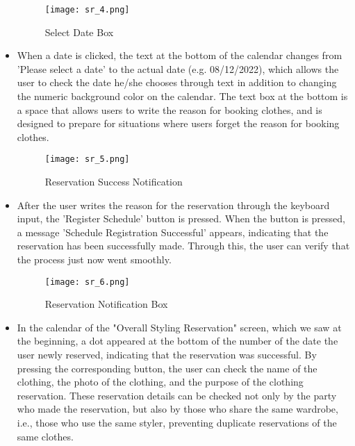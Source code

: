 \documentclass[conference]{IEEEtran}
\begin{document}
\begin{itemize}
    \begin{figure}[htbp]
    \centerline{\texttt{[image: sr\_4.png]}}
    \label{fig}
    \caption{Select Date Box}
    \end{figure}
    \item When a date is clicked, the text at the bottom of the calendar changes from 'Please select a date' to the actual date (e.g. 08/12/2022), which allows the user to check the date he/she chooses through text in addition to changing the numeric background color on the calendar.
    The text box at the bottom is a space that allows users to write the reason for booking clothes, and is designed to prepare for situations where users forget the reason for booking clothes.\\
    
    \newpage
    \begin{figure}[htbp]
    \centerline{\texttt{[image: sr\_5.png]}}
    \label{fig}
    \caption{Reservation Success Notification}
    \end{figure}
    \item After the user writes the reason for the reservation through the keyboard input, the 'Register Schedule' button is pressed. When the button is pressed, a message 'Schedule Registration Successful' appears, indicating that the reservation has been successfully made. Through this, the user can verify that the process just now went smoothly.\\
    
    \begin{figure}[htbp]
    \centerline{\texttt{[image: sr\_6.png]}}
    \label{fig}
    \caption{Reservation Notification Box}
    \end{figure}
    \item In the calendar of the "Overall Styling Reservation" screen, which we saw at the beginning, a dot appeared at the bottom of the number of the date the user newly reserved, indicating that the reservation was successful. By pressing the corresponding button, the user can check the name of the clothing, the photo of the clothing, and the purpose of the clothing reservation. These reservation details can be checked not only by the party who made the reservation, but also by those who share the same wardrobe, i.e., those who use the same styler, preventing duplicate reservations of the same clothes.\\
    
\end{itemize}
\end{document}
